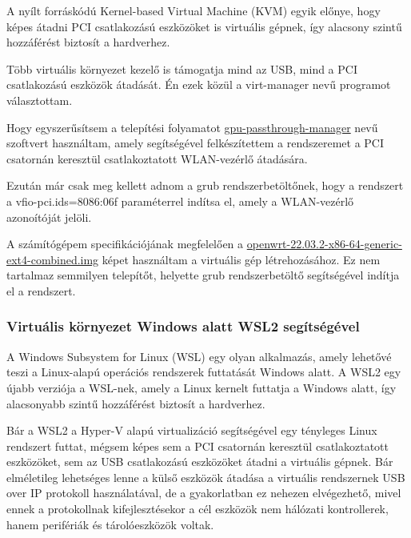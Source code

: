 \documentclass[12pt]{article}
\begin{document}
A nyílt forráskódú Kernel-based Virtual Machine (KVM) egyik előnye, hogy képes
átadni PCI csatlakozású eszközöket is virtuális gépnek, így alacsony szintű hozzáférést biztosít a hardverhez. \cite{kvm} \cite{pci_passthrough}

Több virtuális környezet kezelő is támogatja mind az USB, mind a PCI csatlakozású eszközök átadását. Én ezek közül a virt-manager nevű programot választottam.


Hogy egyszerűsítsem a telepítési folyamatot \href{https://github.com/uwzis/gpu-passthrough-manager}{gpu-passthrough-manager} nevű szoftvert használtam, amely segítségével felkészítettem a rendszeremet a PCI csatornán keresztül csatlakoztatott WLAN-vezérlő átadására.

Ezután már csak meg kellett adnom a grub rendszerbetöltőnek, hogy a rendszert a vfio-pci.ids=8086:06f paraméterrel indítsa el, amely a WLAN-vezérlő azonoítóját jelöli.


A számítógépem specifikációjának megfelelően a \href{https://downloads.openwrt.org/releases/22.03.2/targets/x86/64/openwrt-22.03.2-x86-64-generic-ext4-combined.img.gz}{openwrt-22.03.2-x86-64-generic-ext4-combined.img} képet használtam a virtuális gép létrehozásához. Ez nem tartalmaz semmilyen telepítőt, helyette grub rendszerbetöltő segítségével indítja el a rendszert.

\subsubsection{Virtuális környezet Windows alatt WSL2 segítségével}

A Windows Subsystem for Linux (WSL) egy olyan alkalmazás, amely lehetővé teszi a Linux-alapú operációs rendszerek futtatását Windows alatt. A WSL2 egy újabb verziója a WSL-nek, amely a Linux kernelt futtatja a Windows alatt, így alacsonyabb szintű hozzáférést biztosít a hardverhez. \cite{wsl2}

Bár a WSL2 a Hyper-V alapú virtualizáció segítségével egy tényleges Linux rendszert futtat, mégsem képes sem a PCI csatornán keresztül csatlakoztatott eszközöket, sem az USB csatlakozású eszközöket átadni a virtuális gépnek. Bár elméletileg lehetséges lenne a külső eszközök átadása a virtuális rendszernek USB over IP protokoll használatával, de a gyakorlatban ez nehezen elvégezhető, mivel ennek a protokollnak kifejlesztésekor a cél eszközök nem hálózati kontrollerek, hanem perifériák és tárolóeszközök voltak. \cite{wsl2_usbip}
\end{document}
